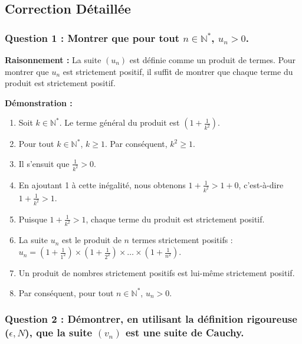 \documentclass[a4paper,11pt]{report}
\begin{document}
\subsection*{Correction Détaillée}

\subsubsection*{Question 1 : Montrer que pour tout $n \in \mathbb{N}^*$, $u_n > 0$.}

\textbf{Raisonnement :}
La suite $(u_n)$ est définie comme un produit de termes. Pour montrer que $u_n$ est strictement positif, il suffit de montrer que chaque terme du produit est strictement positif.

\textbf{Démonstration :}
\begin{enumerate}
\item Soit $k \in \mathbb{N}^*$. Le terme général du produit est $\left(1 + \frac{1}{k^2}\right)$.

\item Pour tout $k \in \mathbb{N}^*$, $k \ge 1$. Par conséquent, $k^2 \ge 1$.

\item Il s'ensuit que $\frac{1}{k^2} > 0$.

\item En ajoutant 1 à cette inégalité, nous obtenons $1 + \frac{1}{k^2} > 1 + 0$, c'est-à-dire $1 + \frac{1}{k^2} > 1$.

\item Puisque $1 + \frac{1}{k^2} > 1$, chaque terme du produit est strictement positif.

\item La suite $u_n$ est le produit de $n$ termes strictement positifs : $u_n = \left(1 + \frac{1}{1^2}\right) \times \left(1 + \frac{1}{2^2}\right) \times \dots \times \left(1 + \frac{1}{n^2}\right)$.

\item Un produit de nombres strictement positifs est lui-même strictement positif.

\item Par conséquent, pour tout $n \in \mathbb{N}^*$, $u_n > 0$.
\end{enumerate}

\subsubsection*{Question 2 : Démontrer, en utilisant la définition rigoureuse ($\epsilon, N$), que la suite $(v_n)$ est une suite de Cauchy.}
\end{document}
